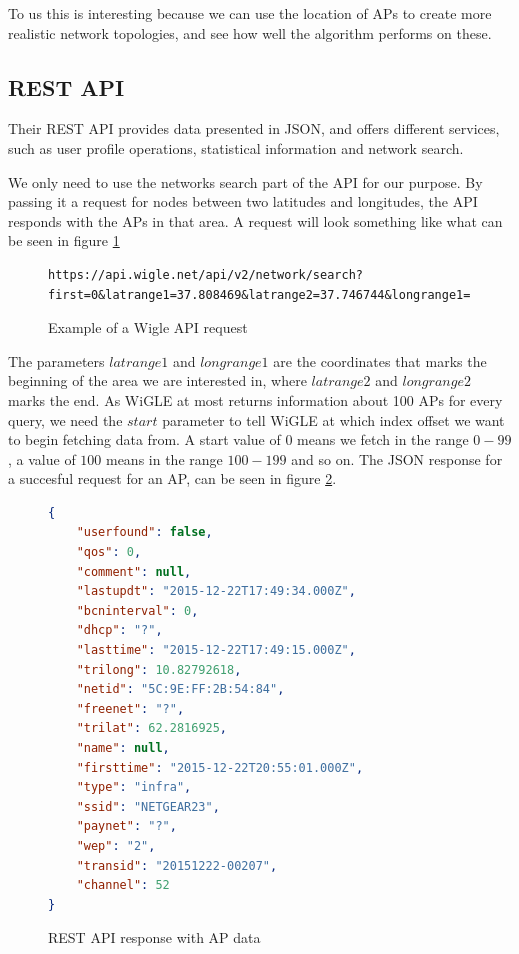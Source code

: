	To us this is interesting because we can use the location of APs to
	create more realistic network topologies, and see how well the algorithm 
	performs on these. 


	\subsection{REST API}
	Their REST API provides data presented in JSON, and offers different services,
	such as user profile operations, statistical information and network search.

	We only need to use the networks search part of the API for our purpose. 
	By passing it a request for nodes between two latitudes
	and longitudes, the API responds with the APs in that area.  
	A request will look something like what can be seen in figure \ref{fig:wigReq}
	\begin{figure}
	\begin{lstlisting}[breaklines]
	https://api.wigle.net/api/v2/network/search?first=0&latrange1=37.808469&latrange2=37.746744&longrange1=-122.539232&longrange2=-122.381355
	\end{lstlisting}
	\caption{Example of a Wigle API request}
	\label{fig:wigReq}
	\end{figure}
	The parameters $latrange1$ and $longrange1$ are the coordinates that marks the beginning 
	of the area we are interested in, where $latrange2$ and $longrange2$ marks the end. 
	As WiGLE at most returns information about 100 APs for every query, we need the $start$
	parameter to tell WiGLE at which index offset we want to begin fetching data from.
	A start value of $0$ means we fetch in the range $0-99$, a value of $100$ means in the
	range $100-199$ and so on. The JSON response for a succesful request for an AP,
	can be seen in figure \ref{fig:wigle}.

	\begin{figure}

	\begin{lstlisting}[language=json]
{
	"userfound": false,
	"qos": 0,
	"comment": null,
	"lastupdt": "2015-12-22T17:49:34.000Z",
	"bcninterval": 0,
	"dhcp": "?",
	"lasttime": "2015-12-22T17:49:15.000Z",
	"trilong": 10.82792618,
	"netid": "5C:9E:FF:2B:54:84",
	"freenet": "?",
	"trilat": 62.2816925,
	"name": null,
	"firsttime": "2015-12-22T20:55:01.000Z",
	"type": "infra",
	"ssid": "NETGEAR23",
	"paynet": "?",
	"wep": "2",
	"transid": "20151222-00207",
	"channel": 52
}

\end{lstlisting}
\caption{REST API response with AP data}
\label{fig:wigle}
\end{figure}

